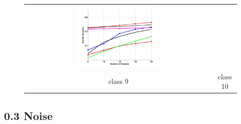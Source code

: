 \begin{figure}[h]
\begin{tabular}{cc}
		\includegraphics[width=0.45\textwidth]{appendix/tables/MNIST_Rate_0_class_10.jpg} \\
		class 9 & class 10\\
	\end{tabular}
\end{figure}
\clearpage



\subsection{0.3 Noise}
